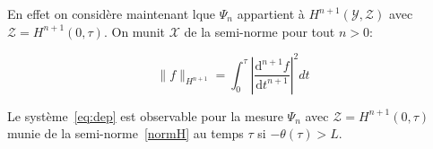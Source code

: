 \documentclass[a4paper]{article}
\begin{document}
En effet on considère maintenant lque $\Psi_n$ appartient à $H^{n+1}(\mathscr{Y},\mathscr{Z})$ avec $\mathscr{Z}=H^{n+1}(0,\tau)$. 
On munit $\mathscr{X}$ de la semi-norme pour tout $n>0$:

\begin{equation}
	\label{normH}
	\|f \|_{H^{n+1} } = \int_0^{\tau} |\frac{\mathrm{d}^{n+1}f}{\mathrm{d}t^{n+1}}|^2 dt
\end{equation}


\begin{proposition}
	Le système~\eqref{eq:dep} est observable pour la mesure $\Psi_n$ avec $\mathscr{Z}=H^{n+1}(0,\tau)$ munie de la semi-norme~\eqref{normH} au temps $\tau$ si $ -\theta(\tau) > L$.
\end{proposition}
\end{document}
